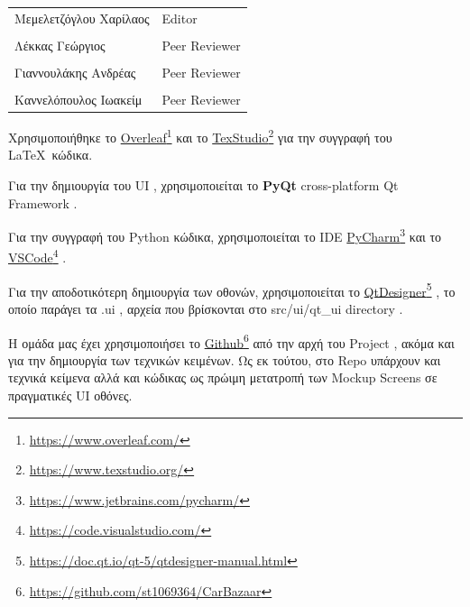 \documentclass{../ol-softwaremanual}
\newcommand{\doclink}[2]{\href{#1}{#2}\footnote{\url{#1}}}
\begin{document}
	
	\vspace{20pt}
	
	\begin{table}[htbp!]
		\begin{tabular}{ll}
			Μεμελετζόγλου Χαρίλαος & \en Editor \\
			\\ Λέκκας Γεώργιος      &   \en  Peer Reviewer \\
			\\ Γιαννουλάκης Ανδρέας & \en Peer Reviewer \\
			\\ Καννελόπουλος Ιωακείμ & \en Peer Reviewer \\ 
		\end{tabular}
	\end{table}
	
	
	
	
	\vspace{20pt}
	\flushleft
	Χρησιμοποιήθηκε το \en \doclink{https://www.overleaf.com/}{Overleaf} \gr και το \en \doclink{https://www.texstudio.org/}{TexStudio} \gr για την συγγραφή του \LaTeX\ κώδικα. \break
	
	Για την δημιουργία του \en UI \gr, χρησιμοποιείται το \en \textbf{PyQt} cross-platform Qt Framework \gr. \break
	
	Για την συγγραφή του \en Python \gr κώδικα, χρησιμοποιείται το \en IDE \doclink{https://www.jetbrains.com/pycharm/}{PyCharm} \gr και το \en \doclink{https://code.visualstudio.com/}{VSCode} \gr .         \\ \break
	
	Για την αποδοτικότερη δημιουργία των οθονών, χρησιμοποιείται το \en \doclink{https://doc.qt.io/qt-5/qtdesigner-manual.html}{QtDesigner} \gr, το οποίο παράγει τα \en .ui \gr, αρχεία που βρίσκονται στο \en src/ui/qt\_ui directory \gr . \break
		
	
	\newpage
	
	
	
	\flushleft
	
	Η ομάδα μας έχει χρησιμοποιήσει το \en \doclink{https://github.com/st1069364/CarBazaar}{Github} \gr από την αρχή του \en Project \gr, ακόμα και για την δημιουργία των τεχνικών κειμένων. Ως εκ τούτου, στο \en Repo \gr υπάρχουν και τεχνικά κείμενα αλλά και κώδικας ως πρώιμη μετατροπή των \en Mockup Screens \gr σε πραγματικές \en UI \gr οθόνες. \break
\end{document}
